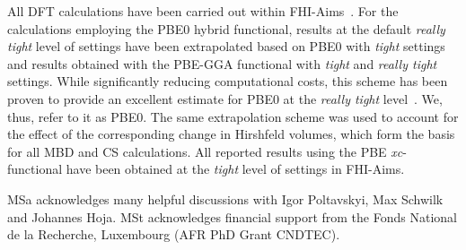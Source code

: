 \documentclass[aps,prl,groupaddress, twocolumn]{revtex4-1}  %
\begin{document}
All DFT calculations have been carried out within FHI-Aims~\cite{fhi_aims}. For the calculations employing the PBE0 hybrid functional, results at the default \emph{really tight} level of settings have been extrapolated based on PBE0 with \emph{tight} settings and results obtained with the PBE-GGA functional with \emph{tight} and \emph{really tight} settings. While significantly reducing computational costs, this scheme has been proven to provide an excellent estimate for PBE0 at the \emph{really tight} level~\cite{Hoja2018}. We, thus, refer to it as PBE0. The same extrapolation scheme was used to account for the effect of the corresponding change in Hirshfeld volumes, which form the basis for all MBD and CS calculations. All reported results using the PBE \textit{xc}-functional have been obtained at the \emph{tight} level of settings in FHI-Aims.
	 
\begin{acknowledgements}
 MSa acknowledges many helpful discussions with Igor Poltavskyi, Max Schwilk and Johannes Hoja.
 MSt acknowledges financial support from the Fonds National de la Recherche, Luxembourg (AFR PhD Grant CNDTEC).
\end{acknowledgements}


\end{document}
